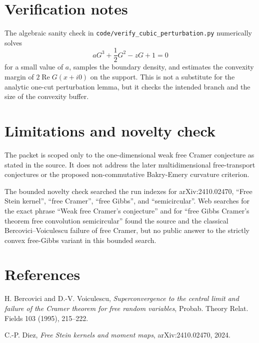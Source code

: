 \documentclass[11pt]{article}
\begin{document}
\section*{Verification notes}

The algebraic sanity check in
\texttt{code/verify\_cubic\_perturbation.py} numerically solves
\[
  aG^3+\frac12G^2-zG+1=0
\]
for a small value of \(a\), samples the boundary density, and estimates the
convexity margin of \(2\operatorname{Re}G(x+i0)\) on the support. This is not
a substitute for the analytic one-cut perturbation lemma, but it checks the
intended branch and the size of the convexity buffer.

\section*{Limitations and novelty check}

The packet is scoped only to the one-dimensional weak free Cramer conjecture
as stated in the source. It does not address the later multidimensional
free-transport conjectures or the proposed non-commutative Bakry-Emery
curvature criterion.

The bounded novelty check searched the run indexes for arXiv:2410.02470,
``Free Stein kernel'', ``free Cramer'', ``free Gibbs'', and ``semicircular''.
Web searches for the exact phrase ``Weak free Cramer's conjecture'' and for
``free Gibbs Cramer's theorem free convolution semicircular'' found the source
and the classical Bercovici--Voiculescu failure of free Cramer, but no public
answer to the strictly convex free-Gibbs variant in this bounded search.

\section*{References}

H. Bercovici and D.-V. Voiculescu,
\emph{Superconvergence to the central limit and failure of the Cramer theorem
for free random variables}, Probab. Theory Relat. Fields 103 (1995), 215--222.

C.-P. Diez, \emph{Free Stein kernels and moment maps}, arXiv:2410.02470, 2024.
\end{document}
